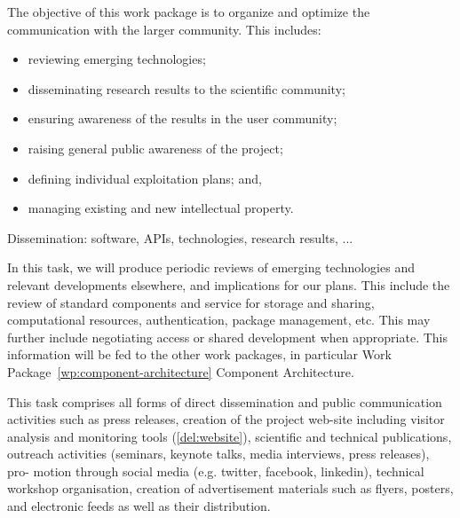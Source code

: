 \begin{workpackage}[id=dissem,wphases=18-48!.5,
  title=Dissemination,
  SARM=1,
  USORM=7]

\begin{wpobjectives}
  The objective of this work package is to organize and optimize the
  communication with the larger community. This includes:
  \begin{itemize}
  \item reviewing emerging technologies;
  \item disseminating research results to the scientific community;
  \item ensuring awareness of the results in the user community;
  \item raising general public awareness of the \TheProject project;
  \item defining individual exploitation plans; and,
  \item managing existing and new intellectual property.
  \end{itemize}
\end{wpobjectives}

\begin{wpdescription}
  Dissemination: software, APIs, technologies, research results, ...
\end{wpdescription}

\begin{tasklist}
\begin{task}[title=Reviewing emerging technologies]
  In this task, we will produce periodic reviews of emerging
  technologies and relevant developments elsewhere, and implications
  for our plans. This include the review of standard components and
  service for storage and sharing, computational resources,
  authentication, package management, etc. This may further include
  negotiating access or shared development when appropriate. This
  information will be fed to the other work packages, in particular
  Work Package~\ref{wp:component-architecture} Component Architecture.
\end{task}

\begin{task}[title=Dissemination and Communication activities]


  This task comprises all forms of direct dissemination and public
  communication activities such as press releases, creation of the
  project web-site including visitor analysis and monitoring tools
  (\ref{del:website}), scientific and technical publications, outreach
  activities (seminars, keynote talks, media interviews, press
  releases), pro- motion through social media (e.g. twitter, facebook,
  linkedin), technical workshop organisation, creation of
  advertisement materials such as flyers, posters, and electronic
  feeds as well as their distribution.


\end{task}
\end{tasklist}
\end{workpackage}
